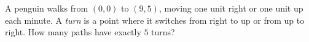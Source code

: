 A penguin walks from $(0,0)$ to $(9,5)$, moving one unit right or one unit up each minute. A \emph{turn} is a point where it switches from right to up or from up to right. How many paths have exactly $5$ turns?

